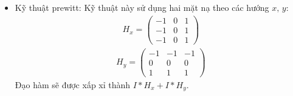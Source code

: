 \documentclass[12pt, oneside, a4paper]{book}
\begin{document}
\begin{itemize}
\item Kỹ thuật prewitt:
Kỹ thuật này sử dụng hai mặt nạ theo các hướng $x,\, y$: 
\begin{align*}
   H_x= \begin{pmatrix}
        -1 & 0 & 1 \\
        -1 & 0 & 1  \\
        -1 & 0 & 1
    \end{pmatrix}
\end{align*}
\begin{align*}
   H_y= \begin{pmatrix}
        -1 & -1 & -1 \\
        0 & 0 & 0  \\
        1 & 1 & 1
    \end{pmatrix}
\end{align*}
Đạo hàm sẽ được xấp xỉ thành $I\ast H_x+I\ast H_y$.


\end{itemize}
\end{document}

